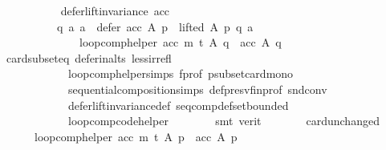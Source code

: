 \begin{isabellebody}
\ \ \ \ \isamarkupfalse%
\isanewline
\ \ \ \ \ \ {\isachardoublequoteopen}defer{\isacharunderscore}{\kern0pt}lift{\isacharunderscore}{\kern0pt}invariance\ {\isacharparenleft}{\kern0pt}acc{\isacharparenright}{\kern0pt}\ {\isasymlongrightarrow}\isanewline
\ \ \ \ \ \ \ \ \ \ {\isacharparenleft}{\kern0pt}{\isasymforall}q\ a{\isachardot}{\kern0pt}\ {\isacharparenleft}{\kern0pt}a\ {\isasymin}\ {\isacharparenleft}{\kern0pt}defer\ {\isacharparenleft}{\kern0pt}acc{\isacharparenright}{\kern0pt}\ A\ p{\isacharparenright}{\kern0pt}\ {\isasymand}\ lifted\ A\ p\ q\ a{\isacharparenright}{\kern0pt}\ {\isasymlongrightarrow}\isanewline
\ \ \ \ \ \ \ \ \ \ \ \ \ \ {\isacharparenleft}{\kern0pt}loop{\isacharunderscore}{\kern0pt}comp{\isacharunderscore}{\kern0pt}helper\ acc\ m\ t{\isacharparenright}{\kern0pt}\ A\ q\ {\isacharequal}{\kern0pt}\ acc\ A\ q{\isacharparenright}{\kern0pt}{\isachardoublequoteclose}\isanewline
\ \ \ \ \ \ \isamarkupfalse%
\ card{\isacharunderscore}{\kern0pt}subset{\isacharunderscore}{\kern0pt}eq\ defer{\isacharunderscore}{\kern0pt}in{\isacharunderscore}{\kern0pt}alts\ less{\isacharunderscore}{\kern0pt}irrefl\isanewline
\ \ \ \ \ \ \ \ \ \ \ \ loop{\isacharunderscore}{\kern0pt}comp{\isacharunderscore}{\kern0pt}helper{\isachardot}{\kern0pt}simps{\isacharparenleft}{\kern0pt}{}{\isacharparenright}{\kern0pt}\ f{\isacharunderscore}{\kern0pt}prof\ psubset{\isacharunderscore}{\kern0pt}card{\isacharunderscore}{\kern0pt}mono\isanewline
\ \ \ \ \ \ \ \ \ \ \ \ sequential{\isacharunderscore}{\kern0pt}composition{\isachardot}{\kern0pt}simps\ def{\isacharunderscore}{\kern0pt}presv{\isacharunderscore}{\kern0pt}fin{\isacharunderscore}{\kern0pt}prof\ snd{\isacharunderscore}{\kern0pt}conv\isanewline
\ \ \ \ \ \ \ \ \ \ \ \ defer{\isacharunderscore}{\kern0pt}lift{\isacharunderscore}{\kern0pt}invariance{\isacharunderscore}{\kern0pt}def\ seq{\isacharunderscore}{\kern0pt}comp{\isacharunderscore}{\kern0pt}def{\isacharunderscore}{\kern0pt}set{\isacharunderscore}{\kern0pt}bounded\isanewline
\ \ \ \ \ \ \ \ \ \ \ \ loop{\isacharunderscore}{\kern0pt}comp{\isacharunderscore}{\kern0pt}code{\isacharunderscore}{\kern0pt}helper\isanewline
\ \ \ \ \ \ \isamarkupfalse%
\ {\isacharparenleft}{\kern0pt}smt\ {\isacharparenleft}{\kern0pt}verit{\isacharparenright}{\kern0pt}{\isacharparenright}{\kern0pt}\isanewline
\ \ \ \ \isamarkupfalse%
\ \isamarkupfalse%
\ card{\isacharunderscore}{\kern0pt}unchanged\ \isamarkupfalse%
\isanewline
\ \ \ \ \ \ {\isachardoublequoteopen}{\isacharparenleft}{\kern0pt}loop{\isacharunderscore}{\kern0pt}comp{\isacharunderscore}{\kern0pt}helper\ acc\ m\ t{\isacharparenright}{\kern0pt}\ A\ p\ {\isacharequal}{\kern0pt}\ acc\ A\ p{\isachardoublequoteclose}\isanewline

\end{isabellebody}
